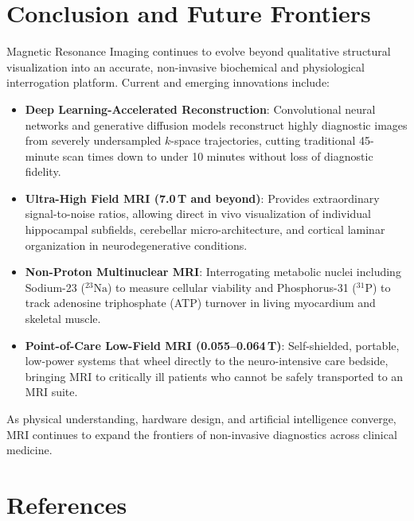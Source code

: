 \documentclass[11pt,a4paper]{article}
\begin{document}
\section{Conclusion and Future Frontiers}

Magnetic Resonance Imaging continues to evolve beyond qualitative structural visualization into an accurate, non-invasive biochemical and physiological interrogation platform. Current and emerging innovations include:
\begin{itemize}[leftmargin=*]
    \item \textbf{Deep Learning-Accelerated Reconstruction}: Convolutional neural networks and generative diffusion models reconstruct highly diagnostic images from severely undersampled $k$-space trajectories, cutting traditional 45-minute scan times down to under 10 minutes without loss of diagnostic fidelity.
    \item \textbf{Ultra-High Field MRI (7.0\,T and beyond)}: Provides extraordinary signal-to-noise ratios, allowing direct in vivo visualization of individual hippocampal subfields, cerebellar micro-architecture, and cortical laminar organization in neurodegenerative conditions.
    \item \textbf{Non-Proton Multinuclear MRI}: Interrogating metabolic nuclei including Sodium-23 ($^{23}\text{Na}$) to measure cellular viability and Phosphorus-31 ($^{31}\text{P}$) to track adenosine triphosphate (ATP) turnover in living myocardium and skeletal muscle.
    \item \textbf{Point-of-Care Low-Field MRI (0.055--0.064\,T)}: Self-shielded, portable, low-power systems that wheel directly to the neuro-intensive care bedside, bringing MRI to critically ill patients who cannot be safely transported to an MRI suite.
\end{itemize}

As physical understanding, hardware design, and artificial intelligence converge, MRI continues to expand the frontiers of non-invasive diagnostics across clinical medicine.

\section*{References}
\end{document}

